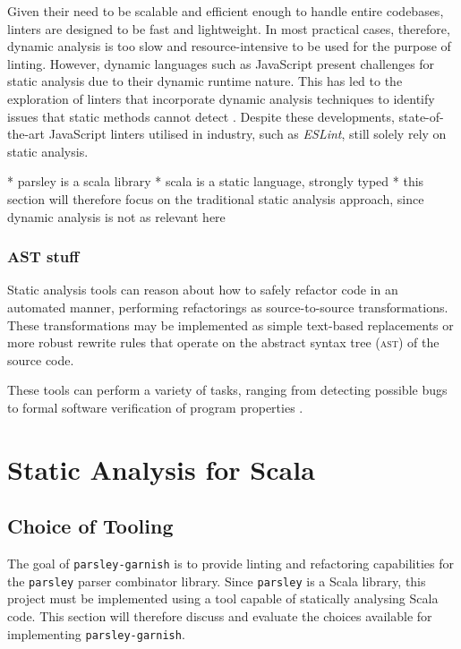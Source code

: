 Given their need to be scalable and efficient enough to handle entire codebases, linters are designed to be fast and lightweight.
In most practical cases, therefore, dynamic analysis is too slow and resource-intensive to be used for the purpose of linting.
However, dynamic languages such as JavaScript present challenges for static analysis due to their dynamic runtime nature.
This has led to the exploration of linters that incorporate dynamic analysis techniques to identify issues that static methods cannot detect \cite{gong_dlint_2015}.
Despite these developments, state-of-the-art JavaScript linters utilised in industry, such as \emph{ESLint}, still solely rely on static analysis.

* parsley is a scala library
* scala is a static language, strongly typed
* this section will therefore focus on the traditional static analysis approach, since dynamic analysis is not as relevant here


\subsubsection{AST stuff}

Static analysis tools can reason about how to safely refactor code in an automated manner, performing refactorings as source-to-source transformations.
These transformations may be implemented as simple text-based replacements or more robust rewrite rules that operate on the abstract syntax tree (\textsc{ast}) of the source code.



These tools can perform a variety of tasks, ranging from detecting possible bugs \cite{johnson_lint_1978,hovemeyer_finding-bugs_2004} to formal software verification of program properties \cite{blanchet_static-analyzer_2003}.

\section{Static Analysis for Scala}


\subsection{Choice of Tooling}
The goal of \texttt{parsley-garnish} is to provide linting and refactoring capabilities for the \texttt{parsley} parser combinator library.
Since \texttt{parsley} is a Scala library, this project must be implemented using a tool capable of statically analysing Scala code.
This section will therefore discuss and evaluate the choices available for implementing \texttt{parsley-garnish}.

